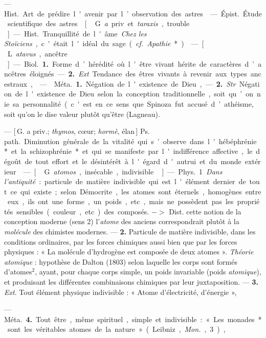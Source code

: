 \begin{itemize}[leftmargin=1cm, label=, itemsep=1pt]
{{ — \si{Hist.} Art de prédire
l'avenir par l’observation des astres.

 — \si{Épist.} Étude scientifique des astres.

 [\,G. {\it a} priv. et {\it taraxis}, trouble\,]. — \si{Hist.} Tranquillité de l'âme.
{\it Chez les Stoïciens}, c'était l'idéal du
sage ({\it cf.}  {\it Apathie}*).

 — [\,L. {\it atavus}, ancêtre\,] —
\si{Biol.} {\bf 1.} Forme d’hérédité où l'être
vivant hérite de caractères d’ancêtres éloignés. — {\bf 2.} {\it Ext}. Tendance
des êtres vivants à revenir aux types
ancestraux,

 —  \si{Méta.} {\bf 1.} Négation de
l'existence de Dieu, — {\bf 2.} {\it Str}. Négation de l'existence de Dieu selon la
conception traditionnelle, soit qu’on
nie sa personnalité (c'est en ce sens
que Spinoza fut accusé d’athéisme},
soit qu’on le dise valeur plutôt
qu'être (Lagneau).

 — [\,G. a priv.; {\it thymos}, cœur; {\it hormè}, élan\,]
\si{Ps. path.} Diminution générale de la vitalité qui s’observe dans
l'hébéphrénie* et la schizophrénie* et qui se manifeste par l'indifférence
affective, le dégoût de tout effort et le désintérêt à l'égard d'autrui et du
monde extérieur.

 — [\,G. {\it atomos}, insécable, indivisible\,] — \si{Phys.} 1 {\it Dans l'antiquité} :
particule de matière indivisible qui
est l'élément dernier de tout ce qui
existe; selon Démocrite, les atomes
sont éternels, homogènes entre eux,
ils ont une forme, un poids, etc.,
mais ne possèdent pas les propriétés
sensibles (couleur, etc.) des composés. $->$ Dist. cette notion de la
conception moderne (sens 2)
l'{\it atome} des anciens correspondrait
plutôt à la {\it molécule} des chimistes
modernes. — {\bf 2.} Particule de matière
indivisible, dans les conditions ordinaires, par les forces chimiques
aussi bien que par les forces physiques : « La molécule d'hydrogène
est composée de deux atomes ».
{\it Théorie atomique} : hypothèse de
Dalton (1803) selon laquelle les
corps sont formés d’atomes$^2$, ayant,
pour chaque corps simple, un poids
invariable (poids {\it atomique}), et produisant les différentes combinaisons
chimiques par leur juxtaposition. —
 {\bf 3.} {\it Ext}. Tout élément physique indivisible : « Atome d'électricité,
d'énergie »,

— \si{Méta.} {\bf 4.} Tout être, même spirituel, simple et indivisible : « Les
monades* sont les véritables atomes
de la nature » (Leibniz, {\it Mon.}, 3),

}
\end{itemize}
